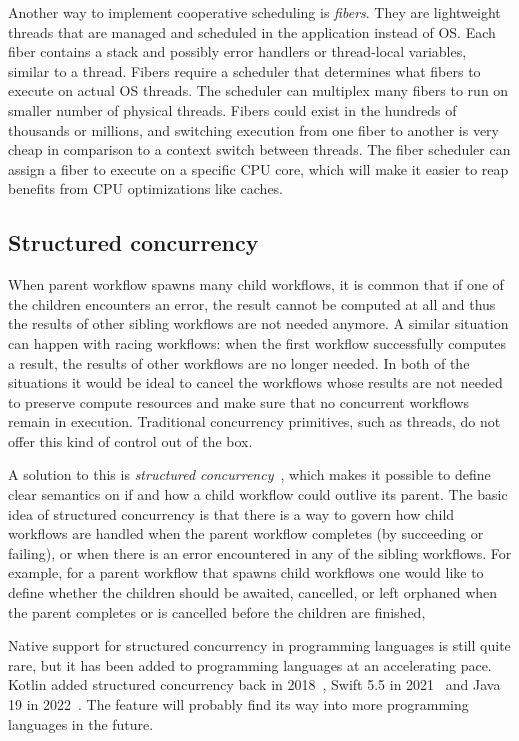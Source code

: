 Another way to implement cooperative scheduling is \textit{fibers}. They are lightweight threads that are managed and scheduled in the application instead of OS. Each fiber contains a stack and possibly error handlers or thread-local variables, similar to a thread. Fibers require a scheduler that determines what fibers to execute on actual OS threads. The scheduler can multiplex many fibers to run on smaller number of physical threads. Fibers could exist in the hundreds of thousands or millions, and switching execution from one fiber to another is very cheap in comparison to a context switch between threads. The fiber scheduler can assign a fiber to execute on a specific CPU core, which will make it easier to reap benefits from CPU optimizations like caches.


\subsection{Structured concurrency}
When parent workflow spawns many child workflows, it is common that if one of the children encounters an error, the result cannot be computed at all and thus the results of other sibling workflows are not needed anymore. A similar situation can happen with racing workflows: when the first workflow successfully computes a result, the results of other workflows are no longer needed. In both of the situations it would be ideal to cancel the workflows whose results are not needed to preserve compute resources and make sure that no concurrent workflows remain in execution. Traditional concurrency primitives, such as threads, do not offer this kind of control out of the box.

A solution to this is \textit{structured concurrency}~\cite{structured-concurrency, go-statement-considered-harmful}, which makes it possible to define clear semantics on if and how a child workflow could outlive its parent. The basic idea of structured concurrency is that there is a way to govern how child workflows are handled when the parent workflow completes (by succeeding or failing), or when there is an error encountered in any of the sibling workflows. For example, for a parent workflow that spawns child workflows one would like to define whether the children should be awaited, cancelled, or left orphaned when the parent completes or is cancelled before the children are finished, 

Native support for structured concurrency in programming languages is still quite rare, but it has been added to programming languages at an accelerating pace. Kotlin added structured concurrency back in 2018~\cite{kotlin-sc}, Swift 5.5 in 2021~\cite{swift-sc} and Java 19 in 2022~\cite{java-sc}. The feature will probably find its way into more programming languages in the future.

